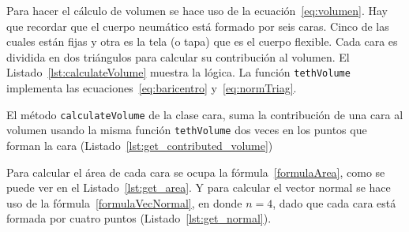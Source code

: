 
Para hacer el cálculo de volumen se hace uso de la ecuación~\eqref{eq:volumen}.
Hay que recordar que el cuerpo neumático está formado por seis caras.
Cinco de las cuales están fijas y otra es la tela (o tapa) que es el cuerpo flexible.
Cada cara es dividida en dos triángulos para calcular su contribución al volumen.
El Listado~\ref{lst:calculateVolume} muestra la lógica. La función \texttt{tethVolume} implementa las ecuaciones~\eqref{eq:baricentro} y~\eqref{eq:normTriag}.


El método \texttt{calculateVolume} de la clase cara, suma la contribución de una cara al volumen usando la misma función \texttt{tethVolume} dos veces en los puntos que forman la cara (Listado~\ref{lst:get_contributed_volume})


Para calcular el área de cada cara se ocupa la fórmula~\eqref{formulaArea}, como se puede ver en el Listado~\ref{lst:get_area}.
Y para calcular el vector normal se hace uso de la fórmula~\eqref{formulaVecNormal}, en donde $n=4$, dado que cada cara está formada por cuatro puntos (Listado~\ref{lst:get_normal}).


